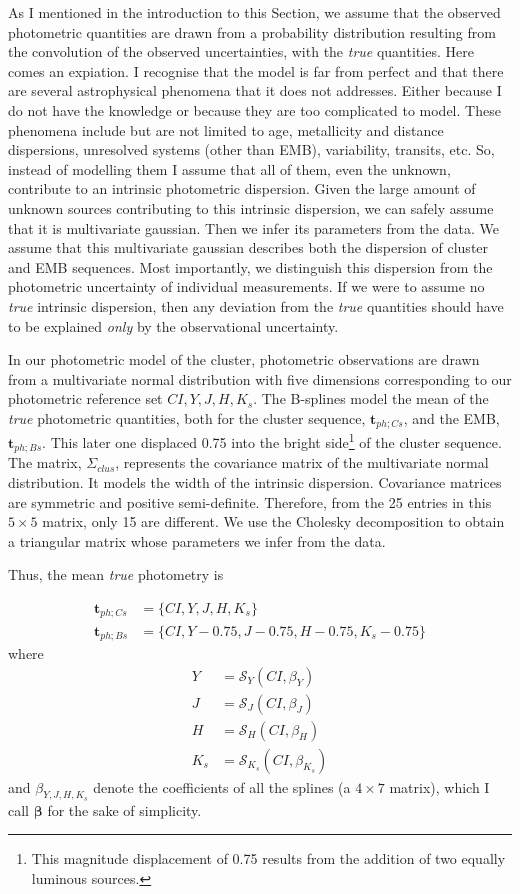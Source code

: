 As I mentioned in the introduction to this Section, we assume that the observed photometric quantities are drawn from a probability distribution resulting from the convolution of the observed uncertainties, with the \emph{true} quantities. Here comes an expiation. I recognise that the model is far from perfect and that there are several astrophysical phenomena that it does not addresses. Either because I do not have the knowledge or because they are too complicated to model. These phenomena include but are not limited to age, metallicity and distance dispersions, unresolved systems (other than EMB), variability, transits, etc. So, instead of modelling them I assume that all of them, even the unknown, contribute to an intrinsic photometric dispersion. Given the large amount of unknown sources contributing to this intrinsic dispersion, we can safely assume that it is multivariate gaussian. Then we infer its parameters from the data.
We assume that this multivariate gaussian describes both the dispersion of cluster and EMB sequences. Most importantly, we distinguish this dispersion from the photometric uncertainty of individual measurements. If we were to assume no \emph{true} intrinsic dispersion, then any deviation from the \emph{true} quantities should have to be explained \emph{only} by the observational uncertainty. 

In our photometric model of the cluster, photometric observations are drawn from a multivariate normal distribution with five dimensions corresponding to our photometric reference set $CI,Y,J,H,K_s$. The B-splines model the mean of the \emph{true} photometric quantities, both for the cluster sequence, $\boldsymbol{t}_{ph;Cs}$, and the EMB, $\boldsymbol{t}_{ph;Bs}$. This later one displaced 0.75 into the bright side\footnote{This magnitude displacement of 0.75 results from the addition of two equally luminous sources.} of the cluster sequence. The matrix, $\Sigma_{clus}$, represents the covariance matrix of the multivariate normal distribution. It models the width of the intrinsic dispersion. Covariance matrices are symmetric and positive semi-definite. Therefore, from the 25 entries in this $5\times 5$ matrix, only 15 are different. We use the Cholesky decomposition to obtain a triangular matrix whose  parameters we infer from the data.

Thus, the mean \emph{true} photometry is

\begin{align}
\boldsymbol{t}_{ph;Cs}&= \{CI,Y,J,H,K_s\}\nonumber \\
\boldsymbol{t}_{ph;Bs}&=\{CI,Y-0.75,J-0.75,H-0.75,K_s-0.75\} \nonumber
\end{align}
where
\begin{align}
Y &=\mathcal{S}_Y(CI,\beta_Y) \nonumber \\
J &=\mathcal{S}_J(CI,\beta_J)\nonumber \\
 H &=\mathcal{S}_H(CI,\beta_H) \nonumber \\
 K_s &=\mathcal{S}_{K_s}(CI,\beta_{K_s})  \nonumber 
\end{align}
and $\beta_{Y,J,H,K_s}$ denote the coefficients of all the splines (a $4\times7$ matrix), which  I call $\boldsymbol{\beta}$ for the sake of simplicity.

